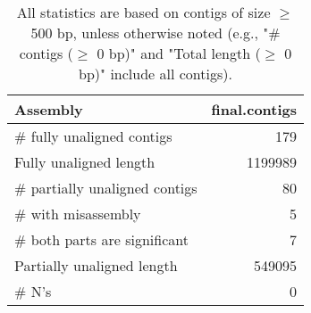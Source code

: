 \documentclass[12pt,a4paper]{article}
\begin{document}
\begin{table}[ht]
\begin{center}
\caption{All statistics are based on contigs of size $\geq$ 500 bp, unless otherwise noted (e.g., "\# contigs ($\geq$ 0 bp)" and "Total length ($\geq$ 0 bp)" include all contigs).}
\begin{tabular}{|l*{1}{|r}|}
\hline
Assembly & final.contigs \\ \hline
\# fully unaligned contigs & 179 \\ \hline
Fully unaligned length & 1199989 \\ \hline
\# partially unaligned contigs & 80 \\ \hline
\hspace{5mm}\# with misassembly & 5 \\ \hline
\hspace{5mm}\# both parts are significant & 7 \\ \hline
Partially unaligned length & 549095 \\ \hline
\# N's & 0 \\ \hline
\end{tabular}
\end{center}
\end{table}
\end{document}
